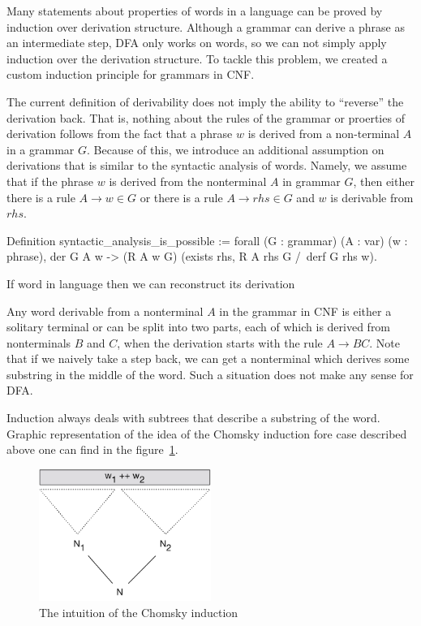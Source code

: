 Many statements about properties of words in a language can be proved by induction over derivation structure. Although a grammar can derive a phrase as an intermediate step, DFA only works on words, so we can not simply apply induction over the derivation structure. To tackle this problem, we created a custom induction principle for grammars in CNF.

The current definition of derivability does not imply the ability to ``reverse'' the derivation back. That is, nothing about the rules of the grammar or proerties of derivation follows from the fact that a phrase $w$ is derived from a non-terminal $A$ in a grammar $G$. Because of this, we introduce an additional assumption on derivations that is similar to the syntactic analysis of words.
Namely, we assume that if the phrase $w$ is derived from the nonterminal $A$ in grammar $G$, then either there is a rule $A \to w \in G$ or there is a rule $A \to rhs \in G$ and $w$ is derivable from $rhs$.

\begin{listing}[h]
    \begin{pyglist}[language=coq, numbers=none, numbersep=5pt]
Definition syntactic_analysis_is_possible :=
  forall (G : grammar) (A : var) (w : phrase),
  der G A w ->
   (R A w \in G) \/ 
   (exists rhs, R A rhs \in G /\ derf G rhs w).
  
  \end{pyglist}
    \caption{If word in language then we can reconstruct its derivation}
    \label{lst:synt-analysis-is-possible}
\end{listing}

Any word derivable from a nonterminal $A$ in the grammar in CNF is either a solitary terminal or can be split into two parts, each of which is derived from nonterminals $B$ and $C$, when the derivation starts with the rule $A \to B C$.
Note that if we naively take a step back, we can get a nonterminal which derives some substring in the middle of the word. 
Such a situation does not make any sense for DFA.

Induction always deals with subtrees that describe a substring of the word.
Graphic representation of the idea of the Chomsky induction fore case described above one can find in the figure~\ref{fig:induction}.

\begin{figure}[htbp]
	\centering
	\includegraphics[width=0.5\textwidth]{ChomskyInductionIntuition}
	\caption{The intuition of the Chomsky induction}
	\label{fig:induction}
\end{figure}

